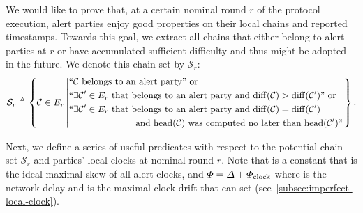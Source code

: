 We would like to prove that, at a certain nominal round $r$ of the protocol execution, alert parties enjoy good properties on their local chains and reported timestamps.
%
Towards this goal, we extract all chains that either belong to alert parties at $r$ or have accumulated sufficient difficulty and thus might be adopted in the future.
%
We denote this chain set by $\mathcal{S}_r$:
%
\begin{equation*}
    \mathcal{S}_r \triangleq
    \left\{
    \chain \in E_r
    \left|
    \begin{aligned}
         & \text{``\chain belongs to an alert party'' or}                                                                                    \\
         & \text{``}\exists \chain'\in E_r ~\text{that belongs to an alert party and}~ \chainDiff{\chain} > \chainDiff{\chain'} \text{'' or} \\
         & \text{``}\exists \chain'\in E_r ~\text{that belongs to an alert party and}~ \chainDiff{\chain} = \chainDiff{\chain'}              \\
         & \hspace{1in} \text{and \chainHead{\chain} was computed no later than \chainHead{\chain'}''}
    \end{aligned}
    \right.
    \right\}.
\end{equation*}

Next, we define a series of useful predicates with respect to the potential chain set $\mathcal{S}_r$ and parties' local clocks at nominal round $r$.
%
Note that \maxskew is a constant that is the ideal maximal skew of all alert clocks, and $\varPhi = \varDelta + \varPhi_{\mathrm{clock}}$ where \delay is the network delay and \maxdrift is the maximal clock drift that \adv can set (see~\cref{subsec:imperfect-local-clock}).

